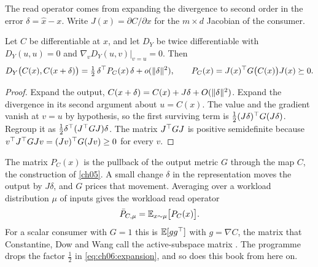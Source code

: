 The read operator comes from expanding the divergence to second order in the error $\delta=\hat x-x$. Write $J(x)=\partial C/\partial x$ for the $m\times d$ Jacobian of the consumer.

\begin{proposition}\label{prop:ch06:expansion}
Let $C$ be differentiable at $x$, and let $D_Y$ be twice differentiable with $D_Y(u,u)=0$ and $\nabla_v D_Y(u,v)|_{v=u}=0$. Then
\begin{equation}\label{eq:ch06:expansion}
D_Y\big(C(x),C(x+\delta)\big)=\tfrac12\,\delta^{\top} P_C(x)\,\delta+o(\lVert \delta\rVert^2),\qquad P_C(x)=J(x)^{\top} G\big(C(x)\big)J(x)\succeq 0 .
\end{equation}
\end{proposition}

\begin{proof}
Expand the output, $C(x+\delta)=C(x)+J\delta+O(\lVert \delta\rVert^2)$. Expand the divergence in its second argument about $u=C(x)$. The value and the gradient vanish at $v=u$ by hypothesis, so the first surviving term is $\tfrac12 (J\delta)^{\top} G (J\delta)$. Regroup it as $\tfrac12\delta^{\top}(J^{\top} G J)\delta$. The matrix $J^{\top} GJ$ is positive semidefinite because $v^{\top} J^{\top} G J v=(Jv)^{\top} G(Jv)\ge 0$ for every $v$.
\end{proof}

The matrix $P_C(x)$ is the pullback of the output metric $G$ through the map $C$, the construction of \cref{ch05}. A small change $\delta$ in the representation moves the output by $J\delta$, and $G$ prices that movement. Averaging over a workload distribution $\mu$ of inputs gives the workload read operator
\begin{equation}\label{eq:ch06:workload}
\bar P_{C,\mu}=\mathbb{E}_{x\sim\mu}\big[P_C(x)\big].
\end{equation}
For a scalar consumer with $G=1$ this is $\mathbb{E}[gg^{\top}]$ with $g=\nabla C$, the matrix that Constantine, Dow and Wang call the active-subspace matrix \cite{constantine2014,constantine2015}. The programme drops the factor $\tfrac12$ in \cref{eq:ch06:expansion}, and so does this book from here on.

